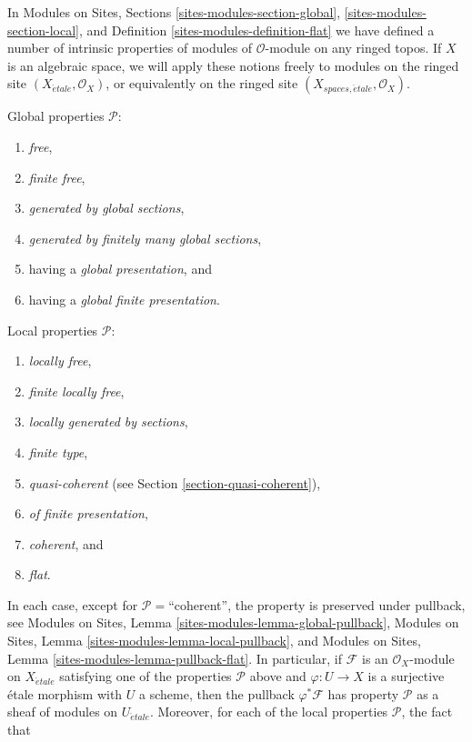 \noindent
In
Modules on Sites, Sections
\ref{sites-modules-section-global},
\ref{sites-modules-section-local}, and
Definition \ref{sites-modules-definition-flat}
we have defined a number of intrinsic properties of modules of
$\mathcal{O}$-module on any ringed topos. If $X$ is an algebraic
space, we will apply these notions freely to modules on the ringed
site $(X_{\acute{e}tale}, \mathcal{O}_X)$, or equivalently on the ringed site
$(X_{spaces, \acute{e}tale}, \mathcal{O}_X)$.

\medskip\noindent
Global properties $\mathcal{P}$:
\begin{enumerate}
\item {\it free},
\item {\it finite free},
\item {\it generated by global sections},
\item {\it generated by finitely many global sections},
\item having a {\it global presentation}, and
\item having a {\it global finite presentation}.
\end{enumerate}
Local properties $\mathcal{P}$:
\begin{enumerate}
\item {\it locally free},
\item {\it finite locally free},
\item {\it locally generated by sections},
\item {\it finite type},
\item {\it quasi-coherent} (see Section \ref{section-quasi-coherent}),
\item {\it of finite presentation},
\item {\it coherent}, and
\item {\it flat}.
\end{enumerate}
In each case, except for $\mathcal{P}=$``coherent'', the property is preserved
under pullback, see
Modules on Sites, Lemma \ref{sites-modules-lemma-global-pullback},
Modules on Sites, Lemma \ref{sites-modules-lemma-local-pullback}, and
Modules on Sites, Lemma \ref{sites-modules-lemma-pullback-flat}.
In particular, if $\mathcal{F}$ is an $\mathcal{O}_X$-module on
$X_{\acute{e}tale}$ satisfying one of the properties $\mathcal{P}$ above
and $\varphi : U \to X$ is a surjective \'etale
morphism with $U$ a scheme, then the pullback $\varphi^*\mathcal{F}$
has property $\mathcal{P}$ as a sheaf of modules on $U_{\acute{e}tale}$.
Moreover, for each of the local properties $\mathcal{P}$, the fact that
